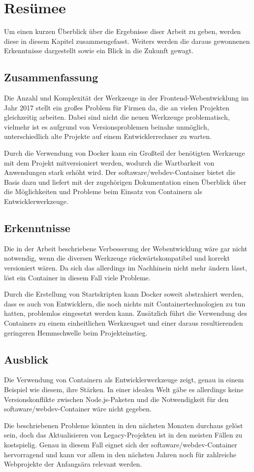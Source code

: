 \chapter{Resümee}
\label{cha:resume}
Um einen kurzen Überblick über die Ergebnisse diser Arbeit zu geben, werden diese in diesem Kapitel zusammengefasst.
Weiters werden die daraus gewonnenen Erkenntnisse dargestellt sowie ein Blick in die Zukunft gewagt.

\section{Zusammenfassung}
\label{sec:summary}
Die Anzahl und Komplexität der Werkzeuge in der Frontend-Webentwicklung im Jahr 2017 stellt ein großes Problem für Firmen da, die an vielen Projekten gleichzeitig arbeiten.
Dabei sind nicht die neuen Werkzeuge problematisch, vielmehr ist es aufgrund von Versionsproblemen beinahe unmöglich, unterschiedlich alte Projekte auf einem Entwicklerrechner zu warten.

Durch die Verwendung von Docker kann ein Großteil der benötigten Werkzeuge mit dem Projekt mitversioniert werden, wodurch die Wartbarkeit von Anwendungen stark erhöht wird.
Der softaware/webdev-Container bietet die Basis dazu und liefert mit der zugehörigen Dokumentation einen Überblick über die Möglichkeiten und Probleme beim Einsatz von Containern als Entwicklerwerkzeuge.

\section{Erkenntnisse}
\label{sec:findings}
Die in der Arbeit beschriebene Verbesserung der Webentwicklung wäre gar nicht notwendig, wenn die diversen Werkzeuge rückwärtskompatibel und korrekt versioniert wären.
Da sich das allerdings im Nachhinein nicht mehr ändern lässt, löst ein Container in diesem Fall viele Probleme.

Durch die Erstellung von Startskripten kann Docker soweit abstrahiert werden, dass es auch von Entwicklern, die noch nichts mit Containertechnologien zu tun hatten, problemlos eingesetzt werden kann.
Zusätzlich führt die Verwendung des Containers zu einem einheitlichen Werkzeugset und einer daraus resultierenden geringeren Hemmschwelle beim Projekteinstieg.

\section{Ausblick}
\label{sec:outlook}
Die Verwendung von Containern als Entwicklerwerkzeuge zeigt, genau in einem Beispiel wie diesem, ihre Stärken.
In einer idealen Welt gäbe es allerdings keine Versionskonflikte zwischen Node.js-Paketen und die Notwendigkeit für den softaware/webdev-Container wäre nicht gegeben.

Die beschriebenen Probleme könnten in den nächsten Monaten durchaus gelöst sein, doch das Aktualisieren von Legacy-Projekten ist in den meisten Fällen zu kostspielig.
Genau in diesem Fall eignet sich der softaware/webdev-Container hervorragend und kann vor allem in den nächsten Jahren noch für zahlreiche Webprojekte der Anfangsära relevant werden.
